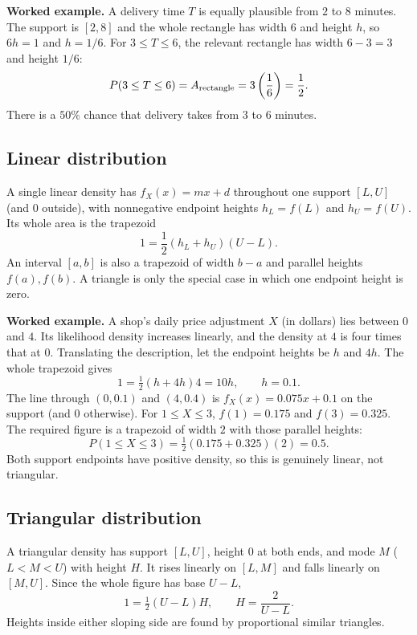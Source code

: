 \textbf{Worked example.} A delivery time $T$ is equally plausible from $2$ to
$8$ minutes.  The support is $[2,8]$ and the whole rectangle has width $6$ and
height $h$, so $6h=1$ and $h=1/6$.  For $3\le T\le6$, the relevant rectangle
has width $6-3=3$ and height $1/6$:
\[
 P(3\le T\le6)=A_{\rm rectangle}=3\left(\frac16\right)=\frac12.
\]
There is a $50\%$ chance that delivery takes from $3$ to $6$ minutes.

\subsection{Linear distribution}\label{sec:c2-intro-linear}
A single linear density has $f_X(x)=mx+d$ throughout one support $[L,U]$
(and $0$ outside), with nonnegative endpoint heights
$h_L=f(L)$ and $h_U=f(U)$.  Its whole area is the trapezoid
\[
 1=\frac12(h_L+h_U)(U-L).
\]
An interval $[a,b]$ is also a trapezoid of width $b-a$ and parallel heights
$f(a),f(b)$.  A triangle is only the special case in which one endpoint height
is zero.

\textbf{Worked example.} A shop's daily price adjustment $X$ (in dollars) lies
between $0$ and $4$.  Its likelihood density increases linearly, and the
density at $4$ is four times that at $0$.  Translating the description, let
the endpoint heights be $h$ and $4h$.  The whole trapezoid gives
\[
 1=\tfrac12(h+4h)4=10h,\qquad h=0.1.
\]
The line through $(0,0.1)$ and $(4,0.4)$ is $f_X(x)=0.075x+0.1$ on the
support (and $0$ otherwise).  For $1\le X\le3$, $f(1)=0.175$ and
$f(3)=0.325$.  The required figure is a
trapezoid of width $2$ with those parallel heights:
\[
 P(1\le X\le3)=\tfrac12(0.175+0.325)(2)=0.5.
\]
Both support endpoints have positive density, so this is genuinely linear,
not triangular.

\subsection{Triangular distribution}\label{sec:c2-intro-triangular}
A triangular density has support $[L,U]$, height $0$ at both ends, and mode
$M$ ($L<M<U$) with height $H$.  It rises linearly on $[L,M]$ and falls linearly
on $[M,U]$.  Since the whole figure has base $U-L$,
\[
 1=\tfrac12(U-L)H,\qquad H=\frac2{U-L}.
\]
Heights inside either sloping side are found by proportional similar triangles.

